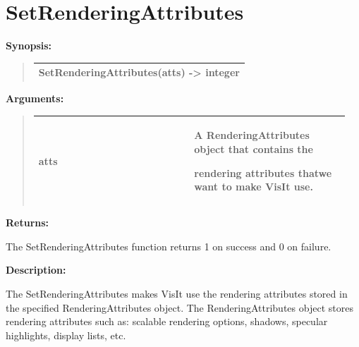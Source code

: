 \documentclass[letterpaper,10pt,english]{sphinxmanual}
\begin{document}
\section{SetRenderingAttributes}
\label{functions:setrenderingattributes}
\begin{DUlineblock}{0em}
\item[] \textbf{Synopsis:}
\end{DUlineblock}
\begin{quote}

\begin{tabulary}{\linewidth}{|L|}
\hline

SetRenderingAttributes(atts) -\textgreater{} integer
\\
\hline\end{tabulary}

\end{quote}

\begin{DUlineblock}{0em}
\item[] 
\item[] \textbf{Arguments:}
\end{DUlineblock}
\begin{quote}

\begin{tabular}{|p{0.475\linewidth}|p{0.475\linewidth}|}
\hline

atts
 & 
\begin{DUlineblock}{0em}
\item[] A RenderingAttributes object that contains the
\item[] rendering attributes thatwe want to make VisIt use.
\end{DUlineblock}
\\
\hline\end{tabular}

\end{quote}

\begin{DUlineblock}{0em}
\item[] 
\item[] \textbf{Returns:}
\item[] The SetRenderingAttributes function returns 1 on success and 0 on failure.
\item[] 
\item[] \textbf{Description:}
\item[] The SetRenderingAttributes makes VisIt use the rendering attributes stored
in the specified RenderingAttributes object. The RenderingAttributes object
stores rendering attributes such as: scalable rendering options, shadows,
specular highlights, display lists, etc.
\end{DUlineblock}
\end{document}
